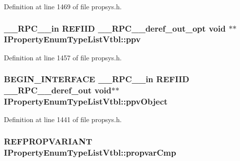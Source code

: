 Definition at line 1469 of file propsys.\+h.

\subsubsection[{\texorpdfstring{ppv}{ppv}}]{ {\bf \+\_\+\+\_\+\+R\+P\+C\+\_\+\+\_\+in} {\bf R\+E\+F\+I\+ID} {\bf \+\_\+\+\_\+\+R\+P\+C\+\_\+\+\_\+deref\+\_\+out\+\_\+opt} {\bf void} $\ast$$\ast$ I\+Property\+Enum\+Type\+List\+Vtbl\+::ppv}\hypertarget{struct_i_property_enum_type_list_vtbl_a294805df488e9cc36fa56fde22de27a1}{}\label{struct_i_property_enum_type_list_vtbl_a294805df488e9cc36fa56fde22de27a1}


Definition at line 1457 of file propsys.\+h.

\subsubsection[{\texorpdfstring{ppv\+Object}{ppvObject}}]{\setlength{\rightskip}{0pt plus 5cm}B\+E\+G\+I\+N\+\_\+\+I\+N\+T\+E\+R\+F\+A\+CE {\bf \+\_\+\+\_\+\+R\+P\+C\+\_\+\+\_\+in} {\bf R\+E\+F\+I\+ID} {\bf \+\_\+\+\_\+\+R\+P\+C\+\_\+\+\_\+deref\+\_\+out} {\bf void}$\ast$$\ast$ I\+Property\+Enum\+Type\+List\+Vtbl\+::ppv\+Object}\hypertarget{struct_i_property_enum_type_list_vtbl_a97963cb303e7d172301cbb2b8f65dfaf}{}\label{struct_i_property_enum_type_list_vtbl_a97963cb303e7d172301cbb2b8f65dfaf}


Definition at line 1441 of file propsys.\+h.

\subsubsection[{\texorpdfstring{propvar\+Cmp}{propvarCmp}}]{ {\bf R\+E\+F\+P\+R\+O\+P\+V\+A\+R\+I\+A\+NT} I\+Property\+Enum\+Type\+List\+Vtbl\+::propvar\+Cmp}\hypertarget{struct_i_property_enum_type_list_vtbl_aa695b0dd04f9dd0e38fb0bebb1b5b7d9}{}\label{struct_i_property_enum_type_list_vtbl_aa695b0dd04f9dd0e38fb0bebb1b5b7d9}


